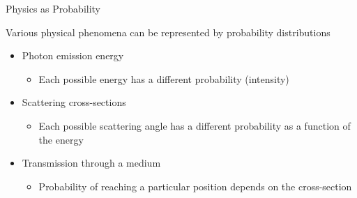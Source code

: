 \documentclass[xcolor=x11names,compress]{beamer}
\renewcommand{\(}{\begin{columns}}
\renewcommand{\)}{\end{columns}}
\newcommand{\<}[1]{\begin{column}{#1}}
\renewcommand{\>}{\end{column}}
\begin{document}
\begin{frame}{Physics as Probability}

Various physical phenomena can be
represented by probability distributions

\begin{itemize}
  \item Photon emission energy
    \begin{itemize}
    \item Each possible energy has a different probability
(intensity)
    \end{itemize} 
    
    \vspace*{0.5 em}
  \item Scattering cross-sections
    \begin{itemize}
    \item Each possible scattering angle has a different
probability as a function of the energy
    \end{itemize}
    
    \vspace*{0.5 em}
  \item Transmission through a medium
    \begin{itemize}
    \item Probability of reaching a particular position
depends on the cross-section
    \end{itemize}
\end{itemize}
\end{frame}
\end{document}
